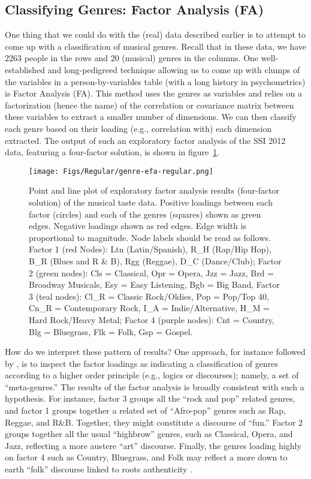 \subsection{Classifying Genres: Factor Analysis (FA)}
One thing that we could do with the (real) data described earlier is to attempt to come up with a classification of musical genres. Recall that in these data, we have $2263$ people in the rows and $20$ (musical) genres in the columns. One well-established and long-pedigreed technique allowing us to come up with clumps of the variables in a person-by-variables table (with a long history in psychometrics) is Factor Analysis (FA). This method uses the genres as variables and relies on a factorization (hence the name) of the correlation or covariance matrix between these variables to extract a smaller number of dimensions. We can then classify each genre based on their loading (e.g., correlation with) each dimension extracted. The output of such an exploratory factor analysis of the SSI 2012 data, featuring a four-factor solution, is shown in figure~\ref{fig:efa}. 

\begin{figure}[ht!]
 \centering
 \texttt{[image: Figs/Regular/genre-efa-regular.png]}
 \caption{\footnotesize Point and line plot of exploratory factor analysis results (four-factor solution) of the musical taste data. Positive loadings between each factor (circles) and each of the genres (squares) shown as green edges. Negative loadings shown as red edges. Edge width is proportional to magnitude. Node labels should be read as follows. Factor 1 (red Nodes): Ltn (Latin/Spanish), R\_H (Rap/Hip Hop), B\_R (Blues and R \& B), Rgg (Reggae), D\_C (Dance/Club); Factor 2 (green nodes): Cls = Classical, Opr = Opera, Jzz = Jazz, Brd = Broadway Musicals, Esy = Easy Listening, Bgb = Big Band, Factor 3 (teal nodes): Cl\_R = Classic Rock/Oldies, Pop = Pop/Top 40, Cn\_R = Contemporary Rock, I\_A = Indie/Alternative, H\_M = Hard Rock/Heavy Metal; Factor 4 (purple nodes): Cnt = Country, Blg = Bluegrass, Flk = Folk, Gsp = Gospel.}
   \label{fig:efa}
\end{figure}

How do we interpret these pattern of results? One approach, for instance followed by \citet{vaneijck01}, is to inspect the factor loadings as indicating a classification of genres according to a higher order principle (e.g., logics or discourses); namely, a set of ``meta-genres.'' The results of the factor analysis is broadly consistent with such a hypothesis. For instance, factor 3 groups all the ``rock and pop'' related genres, and factor 1 groups together a related set of ``Afro-pop'' genres such as Rap, Reggae, and R\&B. Together, they might constitute a discourse of ``fun.'' Factor 2 groups together all the usual ``highbrow'' genres, such as Classical, Opera, and Jazz, reflecting a more austere ``art'' discourse. Finally, the genres loading highly on factor 4 such as Country, Bluegrass, and Folk may reflect a more down to earth ``folk'' discourse linked to roots authenticity \cite{vaneijck01}. 

